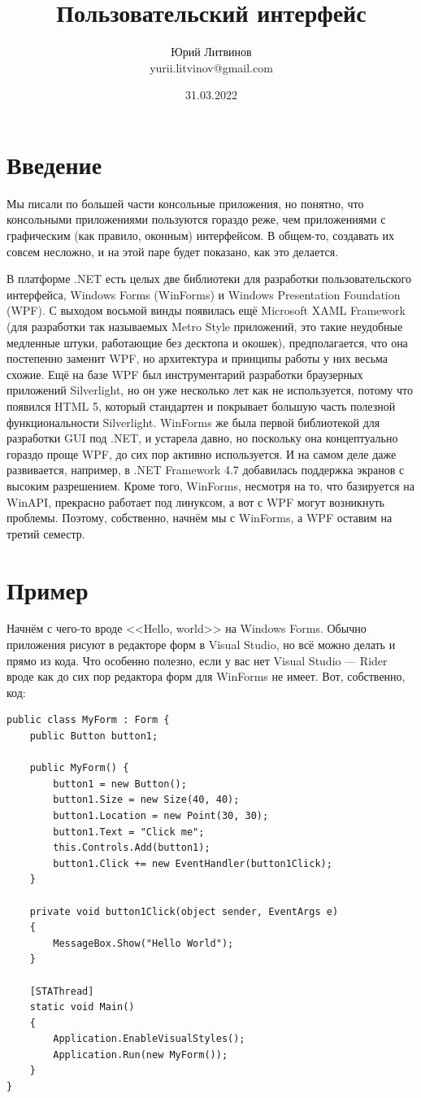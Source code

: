 \documentclass[a5paper]{article}
\title{Пользовательский интерфейс}
\author{Юрий Литвинов\\\small{yurii.litvinov@gmail.com}}
\date{31.03.2022}
\begin{document}
\maketitle
\thispagestyle{empty}

\section{Введение}

Мы писали по большей части консольные приложения, но понятно, что консольными приложениями пользуются гораздо реже, чем приложениями с графическим (как правило, оконным) интерфейсом. В общем-то, создавать их совсем несложно, и на этой паре будет показано, как это делается. 

В платформе .NET есть целых две библиотеки для разработки пользовательского интерфейса, Windows Forms (WinForms) и Windows Presentation Foundation (WPF). С выходом восьмой винды появилась ещё Microsoft XAML Framework (для разработки так называемых Metro Style приложений, это такие неудобные медленные штуки, работающие без десктопа и окошек), предполагается, что она постепенно заменит WPF, но архитектура и принципы работы у них весьма схожие. Ещё на базе WPF был инструментарий разработки браузерных приложений Silverlight, но он уже несколько лет как не используется, потому что появился HTML 5, который стандартен и покрывает большую часть полезной функциональности Silverlight. WinForms же была первой библиотекой для разработки GUI под .NET, и устарела давно, но поскольку она концептуально гораздо проще WPF, до сих пор активно используется. И на самом деле даже развивается, например, в .NET Framework 4.7 добавилась поддержка экранов с высоким разрешением. Кроме того, WinForms, несмотря на то, что базируется на WinAPI, прекрасно работает под линуксом, а вот с WPF могут возникнуть проблемы. Поэтому, собственно, начнём мы с WinForms, а WPF оставим на третий семестр.

\section{Пример}

Начнём с чего-то вроде <<Hello, world>> на Windows Forms. Обычно приложения рисуют в редакторе форм в Visual Studio, но всё можно делать и прямо из кода. Что особенно полезно, если у вас нет Visual Studio --- Rider вроде как до сих пор редактора форм для WinForms не имеет. Вот, собственно, код:

\begin{verbatim}
public class MyForm : Form {
    public Button button1;

    public MyForm() {
        button1 = new Button();
        button1.Size = new Size(40, 40);
        button1.Location = new Point(30, 30);
        button1.Text = "Click me";
        this.Controls.Add(button1);
        button1.Click += new EventHandler(button1Click);
    }

    private void button1Click(object sender, EventArgs e)
    {
        MessageBox.Show("Hello World");
    }

    [STAThread]
    static void Main()
    {
        Application.EnableVisualStyles();
        Application.Run(new MyForm());
    }
}
\end{verbatim}
\end{document}
